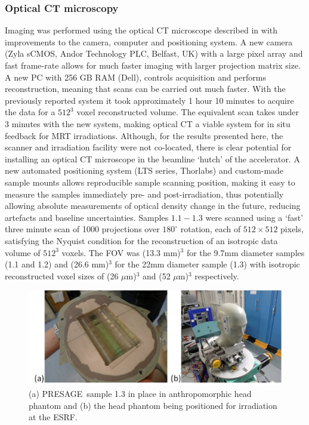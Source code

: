 \documentclass[12pt]{article}
\begin{document}
\subsubsection{Optical CT microscopy}
Imaging was performed using the optical CT microscope described in \cite{doranestablishing2013} with improvements to the camera, computer and positioning system. A new camera (Zyla sCMOS, Andor Technology PLC, Belfast, UK) with a large pixel array and fast frame-rate allows for much faster imaging with larger projection matrix size. A new PC with 256 GB RAM (Dell), controls acquisition and performs reconstruction, meaning that scans can be carried out much faster. With the previously reported system it took approximately 1 hour 10 minutes to acquire the data for a $512^3$ voxel reconstructed volume. The equivalent scan takes under 3 minutes with the new system, making optical CT a viable system for in situ feedback for MRT irradiations. Although, for the results presented here, the scanner and irradiation facility were not co-located, there is clear potential for installing an optical CT microscope in the beamline `hutch' of the accelerator. A new automated positioning system (LTS series, Thorlabs) and custom-made sample mounts allows reproducible sample scanning position, making it easy to measure the samples immediately pre- and post-irradiation, thus potentially allowing absolute measurements of optical density change in the future, reducing artefacts and baseline uncertainties. 
Samples $1.1−1.3$ were scanned using a `fast' three minute scan of 1000 projections over $180^{\circ}$ rotation, each of $512 \times 512$ pixels, satisfying the Nyquist condition for the reconstruction of an isotropic data volume of $512^3$ voxels. The FOV was (13.3 mm)$^3$ for the 9.7mm diameter samples (1.1 and 1.2) and (26.6 mm)$^3$ for the 22mm diameter sample (1.3) with isotropic reconstructed voxel sizes of (26 $\mu$m)$^3$ and (52 $\mu$m)$^3$ respectively.

\begin{figure}
\centering
\includegraphics[width=0.9\linewidth]{Fig1}
\caption{(a) PRESAGE\textregistered \ sample 1.3 in place in anthropomorphic head phantom and (b) the head phantom being positioned for irradiation at the ESRF.}
\label{fig:Fig1christopher}
\end{figure}
\end{document}
